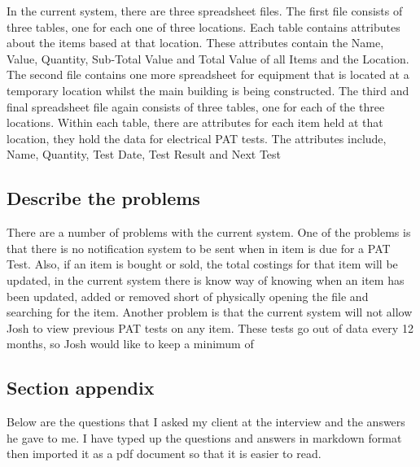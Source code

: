 In the current system, there are three spreadsheet files. The first file consists of three tables, one for each one of three locations. Each table contains attributes about the items based at that location. These attributes contain the Name, Value, Quantity, Sub-Total Value and Total Value of all Items and the Location. The second file contains one more spreadsheet for equipment that is located at a temporary location whilst the main building is being constructed. The third and final spreadsheet file again consists of three tables, one for each of the three locations. Within each table, there are attributes for each item held at that location, they hold the data for electrical PAT tests. The attributes include, Name, Quantity, Test Date, Test Result and Next Test



\subsection{Describe the problems}

There are a number of problems with the current system. One of the problems is that there is no notification system to be sent when in item is due for a PAT Test. Also, if an item is bought or sold, the total costings for that item will be updated, in the current system there is know way of knowing when an item has been updated, added or removed short of physically opening the file and searching for the item. Another problem is that the current system will not allow Josh to view previous PAT tests on any item. These tests go out of data every 12 months, so Josh would like to keep a minimum of 

\subsection{Section appendix}

Below are the questions that I asked my client at the interview and the answers he gave to me. I have typed up the questions and answers in markdown format then imported it as a pdf document so that it is easier to read.

\newpage

